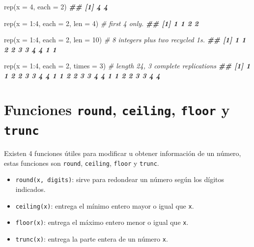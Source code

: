 \documentclass[
]{book}
\newenvironment{Shaded}{\begin{snugshade}}{\end{snugshade}}
\newcommand{\AttributeTok}[1]{\textcolor[rgb]{0.77,0.63,0.00}{#1}}
\newcommand{\CommentTok}[1]{\textcolor[rgb]{0.56,0.35,0.01}{\textit{#1}}}
\newcommand{\DecValTok}[1]{\textcolor[rgb]{0.00,0.00,0.81}{#1}}
\newcommand{\DocumentationTok}[1]{\textcolor[rgb]{0.56,0.35,0.01}{\textbf{\textit{#1}}}}
\newcommand{\FunctionTok}[1]{\textcolor[rgb]{0.00,0.00,0.00}{#1}}
\newcommand{\NormalTok}[1]{#1}
\newcommand{\SpecialCharTok}[1]{\textcolor[rgb]{0.00,0.00,0.00}{#1}}
\providecommand{\tightlist}{%
  \setlength{\itemsep}{0pt}\setlength{\parskip}{0pt}}
\begin{document}
\begin{Shaded}
\begin{Highlighting}[]
\FunctionTok{rep}\NormalTok{(}\AttributeTok{x =} \DecValTok{4}\NormalTok{, }\AttributeTok{each =} \DecValTok{2}\NormalTok{)}
\DocumentationTok{\#\# [1] 4 4}

\FunctionTok{rep}\NormalTok{(}\AttributeTok{x =} \DecValTok{1}\SpecialCharTok{:}\DecValTok{4}\NormalTok{, }\AttributeTok{each =} \DecValTok{2}\NormalTok{, }\AttributeTok{len =} \DecValTok{4}\NormalTok{)    }\CommentTok{\# first 4 only.}
\DocumentationTok{\#\# [1] 1 1 2 2}

\FunctionTok{rep}\NormalTok{(}\AttributeTok{x =} \DecValTok{1}\SpecialCharTok{:}\DecValTok{4}\NormalTok{, }\AttributeTok{each =} \DecValTok{2}\NormalTok{, }\AttributeTok{len  =} \DecValTok{10}\NormalTok{)   }\CommentTok{\# 8 integers plus two recycled 1\textquotesingle{}s.}
\DocumentationTok{\#\#  [1] 1 1 2 2 3 3 4 4 1 1}

\FunctionTok{rep}\NormalTok{(}\AttributeTok{x =} \DecValTok{1}\SpecialCharTok{:}\DecValTok{4}\NormalTok{, }\AttributeTok{each =} \DecValTok{2}\NormalTok{, }\AttributeTok{times =} \DecValTok{3}\NormalTok{)  }\CommentTok{\# length 24, 3 complete replications}
\DocumentationTok{\#\#  [1] 1 1 2 2 3 3 4 4 1 1 2 2 3 3 4 4 1 1 2 2 3 3 4 4}
\end{Highlighting}
\end{Shaded}

\hypertarget{funciones-round-ceiling-floor-y-trunc}{%
\section{\texorpdfstring{Funciones \texttt{round}, \texttt{ceiling}, \texttt{floor} y \texttt{trunc}}{Funciones round, ceiling, floor y trunc}}\label{funciones-round-ceiling-floor-y-trunc}}

Existen 4 funciones útiles para modificar u obtener información de un número, estas funciones son \texttt{round}, \texttt{ceiling}, \texttt{floor} y \texttt{trunc}.

\begin{itemize}
\tightlist
\item
  \texttt{round(x,\ digits)}: sirve para redondear un número según los dígitos indicados.
\item
  \texttt{ceiling(x)}: entrega el mínimo entero mayor o igual que \texttt{x}.
\item
  \texttt{floor(x)}: entrega el máximo entero menor o igual que \texttt{x}.
\item
  \texttt{trunc(x)}: entrega la parte entera de un número \texttt{x}.
\end{itemize}
\end{document}
